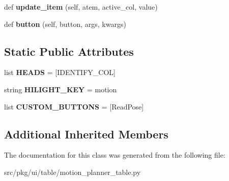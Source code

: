 \begin{DoxyCompactItemize}
\mbox{\label{classrnb-planning_1_1src_1_1pkg_1_1ui_1_1table_1_1motion__planner__table_1_1_motion_plan_table_a7d5379ae92d2dd789b8dfc779e76d541}} 
def {\bfseries update\+\_\+item} (self, atem, active\+\_\+col, value)
\item 
\mbox{\label{classrnb-planning_1_1src_1_1pkg_1_1ui_1_1table_1_1motion__planner__table_1_1_motion_plan_table_a2d601d9c1ed0608f2e86edc31c39fa40}} 
def {\bfseries button} (self, button, args, kwargs)
\end{DoxyCompactItemize}
\subsection*{Static Public Attributes}
\begin{DoxyCompactItemize}
\item 
\mbox{\label{classrnb-planning_1_1src_1_1pkg_1_1ui_1_1table_1_1motion__planner__table_1_1_motion_plan_table_a852c0b1b02ee25ca2a9bd71a53ea12fd}} 
list {\bfseries H\+E\+A\+DS} = \mbox{[}I\+D\+E\+N\+T\+I\+F\+Y\+\_\+\+C\+OL\mbox{]}
\item 
\mbox{\label{classrnb-planning_1_1src_1_1pkg_1_1ui_1_1table_1_1motion__planner__table_1_1_motion_plan_table_a13a96a5a0d447fd444a593332310ac32}} 
string {\bfseries H\+I\+L\+I\+G\+H\+T\+\_\+\+K\+EY} = \textquotesingle{}motion\textquotesingle{}
\item 
\mbox{\label{classrnb-planning_1_1src_1_1pkg_1_1ui_1_1table_1_1motion__planner__table_1_1_motion_plan_table_a24dda79bbefb917ecbf173ae43736c10}} 
list {\bfseries C\+U\+S\+T\+O\+M\+\_\+\+B\+U\+T\+T\+O\+NS} = \mbox{[}\textquotesingle{}Read\+Pose\textquotesingle{}\mbox{]}
\end{DoxyCompactItemize}
\subsection*{Additional Inherited Members}


The documentation for this class was generated from the following file\+:\begin{DoxyCompactItemize}
\item 
src/pkg/ui/table/motion\+\_\+planner\+\_\+table.\+py\end{DoxyCompactItemize}

